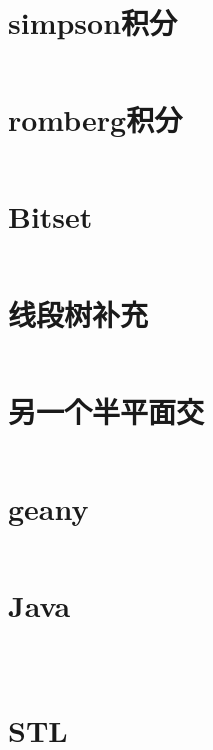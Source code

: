 \documentclass[titlepage,landscape,a4paper,10pt]{article}
\begin{document}
\begin{multicols}{2}
\begin{spacing}{0.8}
\section{simpson积分}
\inputminted{cpp}{/Users/Corn/Desktop/Code/ACM_SCL/code/simpson.cpp}

\section{romberg积分}
\inputminted{cpp}{/Users/Corn/Desktop/Code/ACM_SCL/code/romberg.cpp}

\section{Bitset}
\inputminted{cpp}{/Users/Corn/Desktop/Code/ACM_SCL/code/Bitset.cpp}

\section{线段树补充}
\inputminted{cpp}{/Users/Corn/Desktop/Code/ACM_SCL/code/segtree_extra.cpp}

\section{另一个半平面交}
\inputminted{cpp}{/Users/Corn/Desktop/Code/ACM_SCL/code/Phalf_extra.cpp}

\end{spacing}
\end{multicols}


\begin{multicols}{2}
\begin{spacing}{0.8}
\section{geany}
\inputminted{text}{/Users/Corn/Desktop/Code/ACM_SCL/extra/geany.txt}

\section{Java}
\inputminted{cpp}{/Users/Corn/Desktop/Code/ACM_SCL/extra/Main2.java}
\inputminted{cpp}{/Users/Corn/Desktop/Code/ACM_SCL/extra/BigInteger.java}
\inputminted{cpp}{/Users/Corn/Desktop/Code/ACM_SCL/extra/Main.java}

\section{STL}
\inputminted{cpp}{/Users/Corn/Desktop/Code/ACM_SCL/extra/STL.cpp}

\inputminted{cpp}{/Users/Corn/Desktop/Code/ACM_SCL/extra/pb_ds_tree.cpp}
\inputminted{cpp}{/Users/Corn/Desktop/Code/ACM_SCL/extra/pb_ds_priority.cpp}
\inputminted{cpp}{/Users/Corn/Desktop/Code/ACM_SCL/extra/ext_rope.cpp}
\inputminted{cpp}{/Users/Corn/Desktop/Code/ACM_SCL/extra/MoreStack.cpp}



\end{spacing}

\end{multicols}
\end{document}
